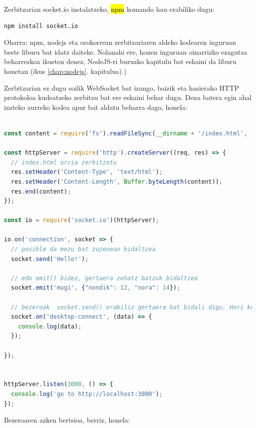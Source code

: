 Zerbitzarian socket.io instalatzeko, \hl{npm} komando hau erabiliko dugu:
\begin{lstlisting}[language=Bash,numbers=none]
npm install socket.io
\end{lstlisting}

Oharra: npm, nodejs eta orokorrean zerbitzariaren aldeko kodearen inguruan beste liburu bat idatz daiteke. Nolanahi ere, honen inguruan oinarrizko ezagutza beharrezkoa ikusten denez, NodeJS-ri buruzko kapitulu bat eskaini da liburu honetan (ikus  \ref{chap:nodejs}. kapitulua).)

Zerbitzarian ez dugu soilik WebSocket bat izango, baizik eta hasierako HTTP protokoloa kudeatzeko zerbitzu bat ere eskaini behar dugu. Dena batera egin ahal izateko aurreko kodea apur bat aldatu beharra dago, honela:

\begin{lstlisting}[language=JavaScript,numbers=none]

const content = require('fs').readFileSync(__dirname + '/index.html', 'utf8');

const httpServer = require('http').createServer((req, res) => {
  // index.html orria zerbitzatu 
  res.setHeader('Content-Type', 'text/html');
  res.setHeader('Content-Length', Buffer.byteLength(content));
  res.end(content);
});

const io = require('socket.io')(httpServer);

io.on('connection', socket => {
  // posible da mezu bat zuzenean bidaltzea
  socket.send('Hello!');

  // edo emit() bidez, gertaera zehatz batzuk bidaltzea
  socket.emit('mugi', {"nondik": 12, "nora": 14});

  // bezeroak  socket.send() erabiliz gertaera bat bidali digu. Hori kudeatzeko:
  socket.on('desktop-connect', (data) => {
    console.log(data);
  });

});


httpServer.listen(3000, () => {
  console.log('go to http://localhost:3000');
});


\end{lstlisting}

Bezeroaren azken bertsioa, berriz, honela:


